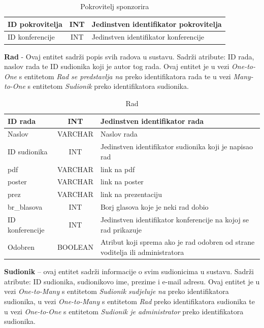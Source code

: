 \begin{table}[H]
	\caption{Pokrovitelj sponzorira}
	\label{tbl:pokroviteljSponzorira}
	\centering
	\begin{tabular}{|l|c|l|} 
		\hline
		\cellcolor{lightblue}ID pokrovitelja & INT & Jedinstven identifikator pokrovitelja\\ 
		\hline
		\cellcolor{lightblue}ID konferencije & INT & Jedinstven identifikator konferencije\\ 
		\hline
	\end{tabular}
\end{table}

\textbf{Rad} - Ovaj entitet sadrži popis svih radova u sustavu. Sadrži atribute: ID rada, naslov rada te ID sudionika koji je autor tog rada. Ovaj entitet je u vezi \textit{One-to-One} s entitetom \textit{Rad se predstavlja na} preko identifikatora rada te u vezi \textit{Many-to-One} s entitetom \textit{Sudionik} preko identifikatora sudionika.

\begin{table}[H]
	\caption{Rad}
	\label{tbl:rad}
	\centering
	\begin{tabular}{|l|c|l|} 
		\hline
		\cellcolor{lightgreen}ID rada & INT & Jedinstven identifikator rada\\ 
		\hline
		Naslov & VARCHAR & Naslov rada\\ 
		\hline
		\cellcolor{lightblue}ID sudionika & INT & Jedinstven identifikator sudionika koji je napisao rad\\ 
		\hline
		pdf & VARCHAR & link na pdf\\ 
		\hline
		poster & VARCHAR & link na poster\\ 
		\hline
		prez & VARCHAR & link na prezentaciju\\ 
		\hline
		br_blasova & INT & Borj glasova koje je neki rad dobio\\ 
		\hline
		\cellcolor{lightblue}ID konferencije & INT & Jedinstven identifikator konferencije na kojoj se rad prikazuje\\ 
		\hline
		Odobren & BOOLEAN & Atribut koji sprema ako je rad odobren od strane voditelja ili administratora\\ 
		\hline
	\end{tabular}
\end{table}

\textbf{Sudionik} – ovaj entitet sadrži informacije o svim sudionicima u sustavu. Sadrži atribute: ID sudionika, sudionikovo ime, prezime i e-mail adresu. Ovaj entitet je u vezi \textit{One-to-Many} s entitetom \textit{Sudionik sudjeluje na} preko identifikatora sudionika, u vezi \textit{One-to-Many} s entitetom \textit{Rad} preko identifikatora sudionika te u vezi \textit{One-to-One} s entitetom \textit{Sudionik je administrator} preko identifikatora sudionika.

